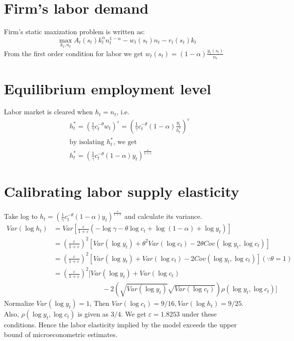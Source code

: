 \documentclass[12pt]{amsart}
\begin{document}
\section{Firm's labor demand}
Firm's static maxization problem is written as: 
\begin{equation*}
\max_{k_t, n_t} A_t(s_t) k_t^\alpha n_t^{1-\alpha} - w_t(s_t) n_t - r_t(s_t) k_t
\end{equation*}
From the first order condition for labor we get $w_t(s_t) = (1-\alpha) \frac{y_t(s_t)}{n_t}$
\section{Equilibrium employment level}
Labor market is cleared when $h_t = n_t$, i.e. 
\begin{align*}
&h_t^{*} = \left( \frac{1}{\gamma} c_t^{-\theta} w_t \right)^\varepsilon = \left( \frac{1}{\gamma} c_t^{-\theta} (1-\alpha) \frac{y_t}{h_t^{*}} \right)^\varepsilon \\
&\text{by isolating $h_t^{*}$, we get} \\
&h_t^{*} = \left(  \frac{1}{\gamma} c_t^{-\theta} (1-\alpha) y_t  \right)^{\frac{\varepsilon}{1+\varepsilon}}
\end{align*}

\section{Calibrating labor supply elasticity}
Take log to $h_t = \left(  \frac{1}{\gamma} c_t^{-\theta} (1-\alpha) y_t  \right)^{\frac{\varepsilon}{1+\varepsilon}}$ and calculate its variance. 
\begin{align*}
Var(\log h_t) &= Var \left[ \frac{\varepsilon}{1+\varepsilon} \left( -\log \gamma -\theta \log c_t + \log (1-\alpha) + \log y_t  \right) \right] \\
& = \left( \frac{\varepsilon}{1+ \varepsilon}\right)^2 \left[ Var(\log y_t) + \theta^2 Var(\log c_t) - 2\theta Cov(\log y_t, \log c_t) \right] \\
& = \left( \frac{\varepsilon}{1+ \varepsilon}\right)^2 \left[ Var(\log y_t) +  Var(\log c_t) - 2 Cov(\log y_t, \log c_t) \right] (\because \theta = 1) \\
& = \left( \frac{\varepsilon}{1+ \varepsilon}\right)^2 \Bigg[ Var(\log y_t) +  Var(\log c_t) \\
& \hspace{3cm} - 2 \left( \sqrt{Var(\log y_t)} \sqrt{Var(\log c_t)} \right)\rho(\log y_t, \log c_t) \Bigg]
\end{align*}
Normalize $Var(\log y_t) = 1$, Then $Var(\log c_t) = 9/16, Var(\log h_t) = 9/25$. Also, $\rho(\log y_t, \log c_t)$ is given as $3/4$. We get $\varepsilon = 1.8253$ under these conditions. Hence the labor elasticity implied by the model exceeds the upper bound of microeconometric estimates.
\end{document}
